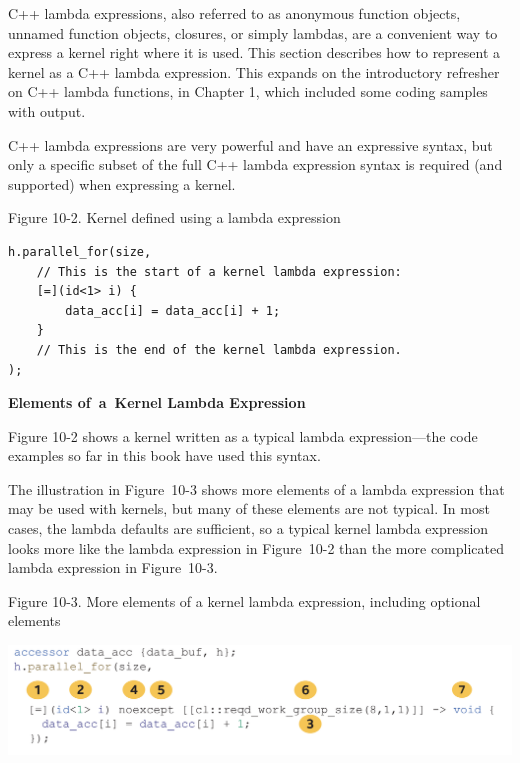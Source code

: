 C++ lambda expressions, also referred to as anonymous function objects, unnamed function objects, closures, or simply lambdas, are a convenient way to express a kernel right where it is used. This section describes how to represent a kernel as a C++ lambda expression. This expands on the introductory refresher on C++ lambda functions, in Chapter 1, which included some coding samples with output.\par

C++ lambda expressions are very powerful and have an expressive syntax, but only a specific subset of the full C++ lambda expression syntax is required (and supported) when expressing a kernel.\par

\hspace*{\fill} \par %
Figure 10-2. Kernel defined using a lambda expression
\begin{lstlisting}[caption={}]
h.parallel_for(size,
	// This is the start of a kernel lambda expression:
	[=](id<1> i) {
		data_acc[i] = data_acc[i] + 1;
	}
	// This is the end of the kernel lambda expression.
);
\end{lstlisting}

\hspace*{\fill} \par %
\textbf{Elements of a Kernel Lambda Expression}

Figure 10-2 shows a kernel written as a typical lambda expression—the code examples so far in this book have used this syntax.\par

The illustration in Figure 10-3 shows more elements of a lambda expression that may be used with kernels, but many of these elements are not typical. In most cases, the lambda defaults are sufficient, so a typical kernel lambda expression looks more like the lambda expression in Figure 10-2 than the more complicated lambda expression in Figure 10-3.\par

\hspace*{\fill} \par %
Figure 10-3. More elements of a kernel lambda expression, including  optional elements
\begin{center}
	\includegraphics[width=1.0\textwidth]{content/chapter-10/images/2}
\end{center}


